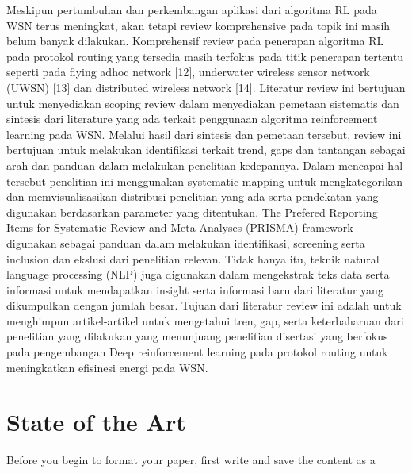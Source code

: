 \documentclass[conference]{IEEEtran}
\begin{document}
Meskipun pertumbuhan dan perkembangan aplikasi dari algoritma RL pada WSN terus meningkat, akan tetapi review komprehensive pada topik ini masih belum banyak dilakukan. Komprehensif review pada penerapan algoritma RL pada protokol routing yang tersedia masih terfokus pada titik penerapan tertentu seperti pada flying adhoc network [12], underwater wireless sensor network (UWSN) [13] dan distributed wireless network [14]. Literatur review ini bertujuan untuk menyediakan scoping review dalam menyediakan pemetaan sistematis dan sintesis dari literature yang ada terkait penggunaan algoritma reinforcement learning pada WSN. Melalui hasil dari sintesis dan pemetaan tersebut, review ini bertujuan untuk melakukan identifikasi terkait trend, gaps dan tantangan sebagai arah dan panduan dalam melakukan penelitian kedepannya. Dalam mencapai hal tersebut penelitian ini menggunakan systematic mapping untuk mengkategorikan dan memvisualisasikan distribusi penelitian yang ada serta pendekatan yang digunakan berdasarkan parameter yang ditentukan. The Prefered Reporting Items for Systematic Review and Meta-Analyses (PRISMA) framework digunakan sebagai panduan dalam melakukan identifikasi, screening serta inclusion dan ekslusi dari penelitian relevan. Tidak hanya itu, teknik natural language processing (NLP) juga digunakan dalam mengekstrak teks data serta informasi untuk mendapatkan insight serta informasi baru dari literatur yang dikumpulkan dengan jumlah besar. Tujuan dari literatur review ini adalah untuk menghimpun artikel-artikel untuk mengetahui tren, gap, serta keterbaharuan dari penelitian yang dilakukan yang menunjuang penelitian disertasi yang berfokus pada pengembangan Deep reinforcement learning pada protokol routing untuk meningkatkan efisinesi energi pada WSN.


\section{State of the Art}
Before you begin to format your paper, first write and save the content as a 
\end{document}
